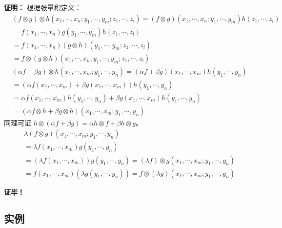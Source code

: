 \textbf{证明：}
根据张量积定义：
\begin{equation}
\begin{aligned}
&(f\otimes g)\otimes h(x_1,\cdots,x_n;y_1,\cdots,y_m;z_1,\cdots,z_l)=(f\otimes g)(x_1,\cdots,x_n;y_1,\cdots,y_m)h(z_1,\cdots,z_l)\\
&=f(x_1,\cdots,x_n)g(y_1,\cdots,y_m)h(z_1,\cdots,z_l)\\
&=f(x_1,\cdots,x_n)(g\otimes h)(y_1,\cdots,y_m;z_1,\cdots,z_l)\\
&=f\otimes(g\otimes h)(x_1,\cdots,x_n;y_1,\cdots,y_m;z_1,\cdots,z_l)
\end{aligned}
\end{equation}
\begin{equation}
\begin{aligned}
&(\alpha f+\beta g)\otimes h(x_1,\cdots,x_m;y_1,\cdots,y_n)=(\alpha f+\beta g)(x_1,\cdots,x_m)h(y_1,\cdots,y_n)\\
&=(\alpha f(x_1,\cdots,x_m)+\beta g(x_1,\cdots,x_m))h(y_1,\cdots,y_n)\\
&=\alpha f(x_1,\cdots,x_m)h(y_1,\cdots,y_n)+\beta g(x_1,\cdots,x_m)h(y_1,\cdots,y_n)\\
&=(\alpha f\otimes h+\beta g\otimes h)(x_1,\cdots,x_m;y_1,\cdots,y_n)
\end{aligned}
\end{equation}
同理可证 $h\otimes(\alpha f+\beta g)=\alpha h\otimes f+\beta h\otimes g$。
\begin{equation}
\begin{aligned}
&\lambda (f\otimes g)(x_1,\cdots,x_m;y_1,\cdots,y_n)\\
&=\lambda f(x_1,\cdots,x_m)g(y_1,\cdots,y_n)\\
&=(\lambda f(x_1,\cdots,x_m))g(y_1,\cdots,y_n)=(\lambda f)\otimes g(x_1,\cdots,x_m;y_1,\cdots,y_n)\\
&= f(x_1,\cdots,x_m)(\lambda g(y_1,\cdots,y_n))=f\otimes(\lambda g)(x_1,\cdots,x_m;y_1,\cdots,y_n)
\end{aligned}
\end{equation}

\textbf{证毕！}
\subsection{实例}

